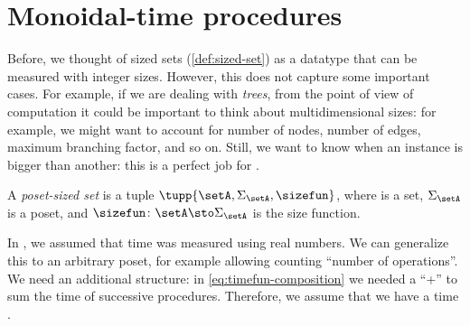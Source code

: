 \section{Monoidal-time procedures}
\label{sec:ProcMod}



Before, we thought of sized sets (\cref{def:sized-set}) as a datatype that can be measured with integer sizes.
However, this does not capture some important cases.
For example, if we are dealing with \emph{trees}, from the point of view of computation it could be important to think about multidimensional sizes: for example, we might want to account for number of nodes, number of edges, maximum branching factor, and so on.
Still, we want to know when an instance is bigger than another: this is a perfect job for .

\begin{definition}
    \label{def:poset-sized-set}
    A \emph{poset-sized set} is a tuple $\tupp{\setA, \Sigma_{\setA}, \sizefun}$, where \setA is a set, $\Sigma_\setA$ is a poset, and $\sizefun \colon \setA \sto \Sigma_\setA$ is the size function.
\end{definition}

In \ProcSizeTime, we assumed that time was measured using real numbers.
We can generalize this to an arbitrary poset, for example allowing counting ``number of operations''.
We need an additional structure: in \vref{eq:timefun-composition} we needed a ``+'' to sum the time of successive procedures.
Therefore, we assume that we have a time  \TimeMonoidal.

